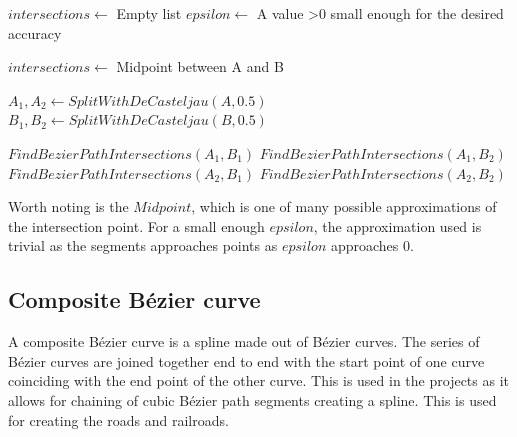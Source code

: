         \vspace{1cm}
        \begin{algorithmic}
            \State $intersections \gets$ Empty list
            \State $epsilon \gets$ A value >0 small enough for the desired accuracy
                    \State \Return
                \EndIf

                    \State $intersections \gets$ Midpoint between A and B
                    \State \Return
                \EndIf

                \State $A_1, A_2 \gets SplitWithDeCasteljau(A, 0.5)$
                \State $B_1, B_2 \gets SplitWithDeCasteljau(B, 0.5)$

                \State $FindBezierPathIntersections(A_1, B_1)$
                \State $FindBezierPathIntersections(A_1, B_2)$
                \State $FindBezierPathIntersections(A_2, B_1)$
                \State $FindBezierPathIntersections(A_2, B_2)$
            \EndProcedure
        \end{algorithmic}
        \vspace{1cm}

        Worth noting is the $Midpoint$, which is one of many possible approximations of the intersection point. For a small enough $epsilon$, the approximation used is trivial as the segments approaches points as $epsilon$ approaches 0.

    \subsection{Composite Bézier curve}
        A composite Bézier curve is a spline made out of Bézier curves. The series of Bézier curves are joined together end to end with the start point of one curve coinciding with the end point of the other curve. This is used in the projects as it allows for chaining of cubic Bézier path segments creating a spline. This is used for creating the roads and railroads.